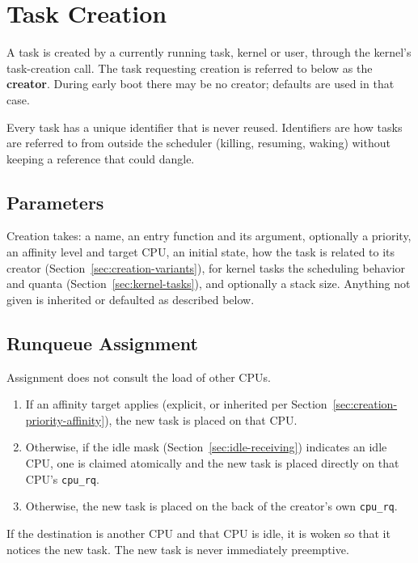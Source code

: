 \documentclass[11pt]{article}
\begin{document}
\section{Task Creation}
\label{sec:task-creation}

A task is created by a currently running task, kernel or user, through the kernel's task-creation call.
The task requesting creation is referred to below as the \textbf{creator}.
During early boot there may be no creator; defaults are used in that case.

Every task has a unique identifier that is never reused. Identifiers are how tasks are referred to from outside the scheduler (killing, resuming, waking) without keeping a reference that could dangle.

\subsection{Parameters}

Creation takes: a name, an entry function and its argument, optionally a priority, an affinity level and target CPU, an initial state, how the task is related to its creator (Section~\ref{sec:creation-variants}), for kernel tasks the scheduling behavior and quanta (Section~\ref{sec:kernel-tasks}), and optionally a stack size.
Anything not given is inherited or defaulted as described below.

\subsection{Runqueue Assignment}
\label{sec:creation-rq-assignment}

Assignment does not consult the load of other CPUs.

\begin{enumerate}
	\item If an affinity target applies (explicit, or inherited per Section~\ref{sec:creation-priority-affinity}), the new task is placed on that CPU.
	\item Otherwise, if the idle mask (Section~\ref{sec:idle-receiving}) indicates an idle CPU, one is claimed atomically and the new task is placed directly on that CPU's \texttt{cpu\_rq}.
	\item Otherwise, the new task is placed on the back of the creator's own \texttt{cpu\_rq}.
\end{enumerate}

If the destination is another CPU and that CPU is idle, it is woken so that it notices the new task. The new task is never immediately preemptive.
\end{document}
